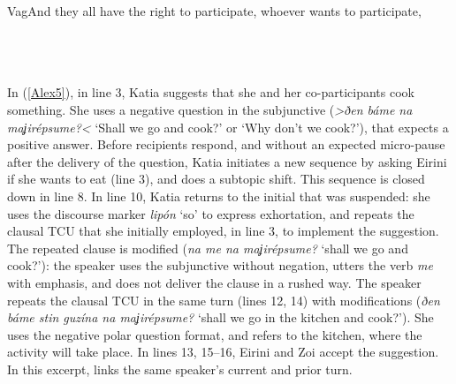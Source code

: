 \documentclass[output=paper]{LSP/langsci}
\begin{document}
\begin{Transcript}[FS {>}{>}]{Vag}{And they all have the right to participate, whoever wants to participate,}
\\                   
    \\                 
\\
\\    
\end{Transcript}

In (\ref{Alex5}), in line 3, Katia suggests that she and her co-participants cook something. She uses a negative question in the subjunctive (\textit{>ðen báme na maʝirépsume?<} `Shall we go and cook?' or `Why don’t we cook?'), that expects a positive answer. Before recipients respond, and without an expected micro-pause after the delivery of the question, Katia initiates a new sequence by asking Eirini if she wants to eat (line 3), and does a subtopic shift. This sequence is closed down in line 8. In line 10, Katia returns to the initial  that was suspended: she uses the discourse marker \textit{lipón} `so' to express exhortation, and repeats the clausal TCU that she initially employed, in line 3, to implement the suggestion. The repeated clause is modified (\textit{na \underline{}me na maʝirépsume?} `shall we go and cook?'): the speaker uses the subjunctive without negation, utters the verb \textit{\underline{}me} with emphasis, and does not deliver the clause in a rushed way. The speaker repeats the clausal TCU in the same turn (lines 12, 14) with modifications (\textit{ðen báme stin guzína na maʝirépsume?} `shall we go in the kitchen and cook?'). She uses the negative polar question format, and refers to the kitchen, where the activity will take place. In lines 13, 15--16, Eirini and Zoi accept the suggestion. In this excerpt,  links the same speaker’s current and prior turn. 
\end{document}
